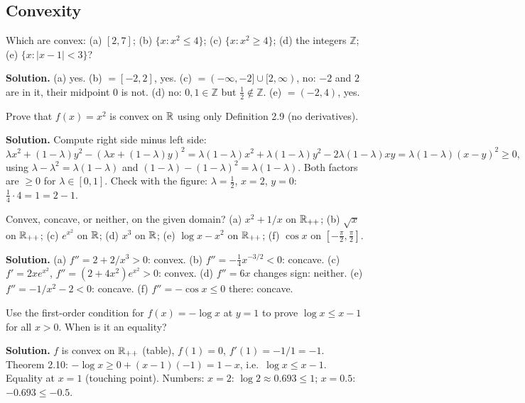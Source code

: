 \subsection{Convexity}

\begin{example}
Which are convex: (a) $[2,7]$; (b) $\{x: x^2\le4\}$; (c) $\{x: x^2\ge4\}$; (d) the integers $\mathbb Z$; (e) $\{x:|x-1|<3\}$?

\textbf{Solution.} (a) yes. (b) $=[-2,2]$, yes. (c) $=(-\infty,-2]\cup[2,\infty)$, no: $-2$ and $2$ are in it, their midpoint $0$ is not.
(d) no: $0,1\in\mathbb Z$ but $\tfrac12\notin\mathbb Z$. (e) $=(-2,4)$, yes.
\end{example}

\begin{example}
Prove that $f(x)=x^2$ is convex on $\mathbb{R}$ using only Definition 2.9 (no derivatives).

\textbf{Solution.} Compute right side minus left side:
\[ \lambda x^2+(1-\lambda)y^2-(\lambda x+(1-\lambda)y)^2 = \lambda(1-\lambda)x^2+\lambda(1-\lambda)y^2-2\lambda(1-\lambda)xy = \lambda(1-\lambda)(x-y)^2\ge0, \]
using $\lambda-\lambda^2=\lambda(1-\lambda)$ and $(1-\lambda)-(1-\lambda)^2=\lambda(1-\lambda)$. Both factors are $\ge0$ for $\lambda\in[0,1]$. Check with the figure:
$\lambda=\tfrac12$, $x=2$, $y=0$: $\tfrac14\cdot4=1 = 2-1$. \checkmark
\end{example}

\begin{example}
Convex, concave, or neither, on the given domain? (a) $x^2+1/x$ on $\mathbb{R}_{++}$; (b) $\sqrt x$ on $\mathbb{R}_{++}$; (c) $e^{x^2}$ on $\mathbb{R}$; (d) $x^3$ on $\mathbb{R}$; (e) $\log x - x^2$ on $\mathbb{R}_{++}$; (f) $\cos x$ on $[-\tfrac\pi2,\tfrac\pi2]$.

\textbf{Solution.}
(a) $f''=2+2/x^3>0$: convex.
(b) $f''=-\tfrac14x^{-3/2}<0$: concave.
(c) $f'=2xe^{x^2}$, $f''=(2+4x^2)e^{x^2}>0$: convex.
(d) $f''=6x$ changes sign: neither.
(e) $f''=-1/x^2-2<0$: concave.
(f) $f''=-\cos x\le0$ there: concave.
\end{example}

\begin{example}
Use the first-order condition for $f(x)=-\log x$ at $y=1$ to prove $\log x\le x-1$ for all $x>0$. When is it an equality?

\textbf{Solution.} $f$ is convex on $\mathbb{R}_{++}$ (table), $f(1)=0$, $f'(1)=-1/1=-1$. Theorem 2.10: $-\log x\ge0+(x-1)(-1)=1-x$, i.e.\ $\log x\le x-1$.
Equality at $x=1$ (touching point). Numbers: $x=2$: $\log2\approx0.693\le1$; $x=0.5$: $-0.693\le-0.5$. \checkmark
\end{example}

